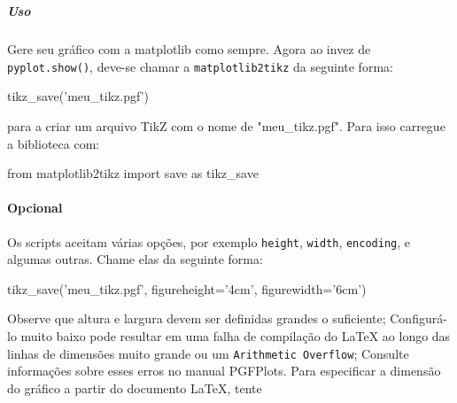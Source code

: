 \documentclass[11pt]{article}
\newenvironment{Shaded}{}{}
\newcommand{\StringTok}[1]{\textcolor[rgb]{0.25,0.44,0.63}{{#1}}}
\newcommand{\NormalTok}[1]{{#1}}
\newcommand{\ImportTok}[1]{{#1}}
\newcommand{\OperatorTok}[1]{\textcolor[rgb]{0.40,0.40,0.40}{{#1}}}
\begin{document}
    \begin{center}
    \end{center}
    { \hspace*{\fill} \\}
    
    \subparagraph{Uso}\label{uso}

Gere seu gráfico com a matplotlib como sempre. Agora ao invez de
\texttt{pyplot.show()}, deve-se chamar a \texttt{matplotlib2tikz} da
seguinte forma:

\begin{Shaded}
\begin{Highlighting}[]
\NormalTok{tikz_save(}\StringTok{'meu_tikz.pgf'}\NormalTok{)}
\end{Highlighting}
\end{Shaded}

para a criar um arquivo TikZ com o nome de "meu\_tikz.pgf". Para isso
carregue a biblioteca com:

\begin{Shaded}
\begin{Highlighting}[]
\ImportTok{from} \NormalTok{matplotlib2tikz }\ImportTok{import} \NormalTok{save }\ImportTok{as} \NormalTok{tikz_save}
\end{Highlighting}
\end{Shaded}

\paragraph{Opcional}\label{opcional}

Os scripts aceitam várias opções, por exemplo \texttt{height},
\texttt{width}, \texttt{encoding}, e algumas outras. Chame elas da
seguinte forma:

\begin{Shaded}
\begin{Highlighting}[]
\NormalTok{tikz_save(}\StringTok{'meu_tikz.pgf'}\NormalTok{, figureheight}\OperatorTok{=}\StringTok{'4cm'}\NormalTok{, figurewidth}\OperatorTok{=}\StringTok{'6cm'}\NormalTok{)}
\end{Highlighting}
\end{Shaded}

Observe que altura e largura devem ser definidas grandes o suficiente;
Configurá-lo muito baixo pode resultar em uma falha de compilação do
LaTeX ao longo das linhas de dimensões muito grande ou um
\texttt{Arithmetic\ Overflow}; Consulte informações sobre esses erros no
manual PGFPlots. Para especificar a dimensão do gráfico a partir do
documento \LaTeX, tente
\end{document}
